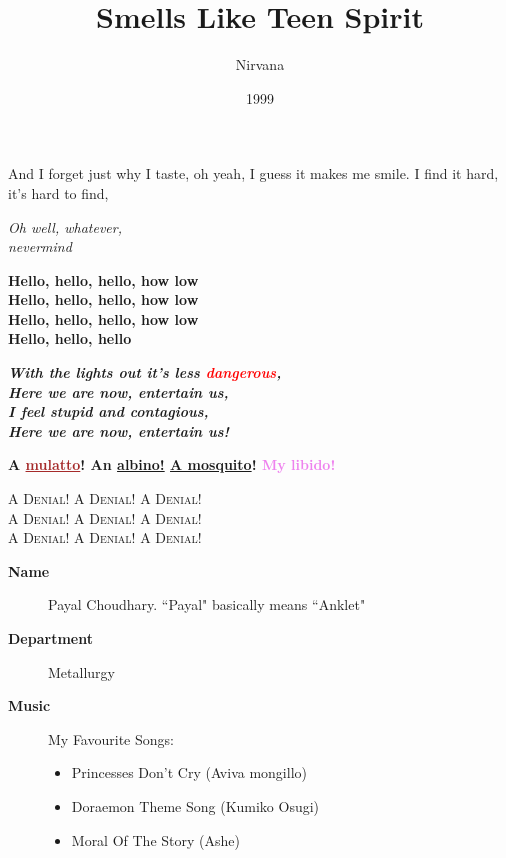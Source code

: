 \documentclass[letter paper]{article}
\begin{document}
\title{Smells Like Teen Spirit}
\author{Nirvana }
\date{1999}




\maketitle

And I forget just why I taste, oh yeah, I guess it makes me smile.
I find it hard, it’s hard to find,

\raggedleft
\textit {Oh well, whatever,\\
nevermind}

\RaggedRight
\textbf {Hello, hello, hello, how low\\
Hello, hello, hello, how low\\
Hello, hello, hello, how low\\
Hello, hello, hello
}
\vspace{1cm}

\textbf{\textit {With the lights out it’s less {\textcolor{red} {dangerous}},\\
Here we are now, entertain us,\\
{\textcolor{brickred}{I feel stupid and contagious,}}\\
Here we are now, entertain us!
}}

\vspace{1cm}

\hspace{3cm}
  {\textbf{  A  {\textcolor {brown}{\underline {mulatto}}}! An {\textcolor{black!30}{\underline {albino!}}} {\underline{A mosquito}}! {\textcolor{violet}{ My libido!}}}\\



    \vspace{0.5cm}
\begin{center}

{\textsc{A Denial! A Denial! A Denial!}\\
\vspace{0.5cm}
\large {\textsc {A Denial! A Denial! A Denial!}}\\
\vspace{0.5cm}
\huge{\textsc {A Denial! A Denial! A Denial!}}}
\end{center}

\newpage

\begin{description}
 \item [ \textbf {Name}]  Payal Choudhary. ``Payal" basically means ``Anklet"
 \item [ \textbf {Department}] Metallurgy
 \item [ \textbf {Music}] My Favourite Songs:


\begin{itemize}
    \item Princesses Don't Cry (Aviva mongillo)\\
    \item  Doraemon Theme Song (Kumiko Osugi)\\
    \item  Moral Of The Story (Ashe)
\end{itemize}
\end{description}

}
\end{document}
